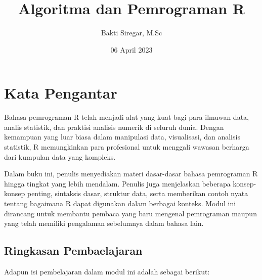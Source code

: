 \documentclass[
]{book}
\title{Algoritma dan Pemrograman R}
\author{Bakti Siregar, M.Sc}
\date{06 April 2023}
\theoremstyle{definition}
\theoremstyle{definition}
\theoremstyle{definition}
\theoremstyle{definition}
\theoremstyle{remark}
\begin{document}
\maketitle

{
\setcounter{tocdepth}{1}
\tableofcontents
}
\hypertarget{kata-pengantar}{%
\chapter*{Kata Pengantar}\label{kata-pengantar}}

Bahasa pemrograman R telah menjadi alat yang kuat bagi para ilmuwan data, analis statistik, dan praktisi analisis numerik di seluruh dunia. Dengan kemampuan yang luar biasa dalam manipulasi data, visualisasi, dan analisis statistik, R memungkinkan para profesional untuk menggali wawasan berharga dari kumpulan data yang kompleks.

Dalam buku ini, penulis menyediakan materi dasar-dasar bahasa pemrograman R hingga tingkat yang lebih mendalam. Penulis juga menjelaskan beberapa konsep-konsep penting, sintaksis dasar, struktur data, serta memberikan contoh nyata tentang bagaimana R dapat digunakan dalam berbagai konteks. Modul ini dirancang untuk membantu pembaca yang baru mengenal pemrograman maupun yang telah memiliki pengalaman sebelumnya dalam bahasa lain.

\hypertarget{ringkasan-pembaelajaran}{%
\section*{Ringkasan Pembaelajaran}\label{ringkasan-pembaelajaran}}

Adapun isi pembelajaran dalam modul ini adalah sebagai berikut:
\end{document}
